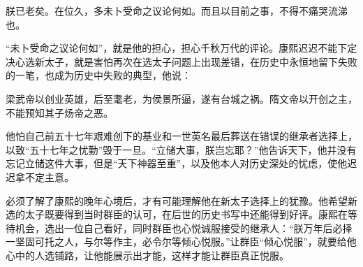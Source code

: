 
\begin{bookquote}朕已老矣。在位久，多未卜受命之议论何如。而且以目前之事，不得不痛哭流涕也。\end{bookquote}


“未卜受命之议论何如”，就是他的担心，担心千秋万代的评论。康熙迟迟不能下定决心选新太子，就是害怕再次在选太子问题上出现差错，在历史中永恒地留下失败的一笔，也成为历史中失败的典型，他说：



\begin{bookquote}梁武帝以创业英雄，后至耄老，为侯景所逼，遂有台城之祸。隋文帝以开创之主，不能预知其子炀帝之恶。\end{bookquote}


他怕自己前五十七年艰难创下的基业和一世英名最后葬送在错误的继承者选择上，以致“五十七年之忧勤”毁于一旦。“立储大事，朕岂忘耶？”他告诉天下，他并没有忘记立储这件大事，但是“天下神器至重”，以及他本人对历史深处的忧虑，使他迟迟拿不定主意。



必须了解了康熙的晚年心境后，才有可能理解他在新太子选择上的犹豫。他希望新选的太子既要得到当时群臣的认可，在后世的历史书写中还能得到好评。康熙在等待机会，选出一位自己看好，同时群臣也心悦诚服接受的继承人：“朕万年后必择一坚固可托之人，与尔等作主，必令尔等倾心悦服。”让群臣“倾心悦服”，就要给他心中的人选铺路，让他能展示出才能，这样才能让群臣真正悦服。


